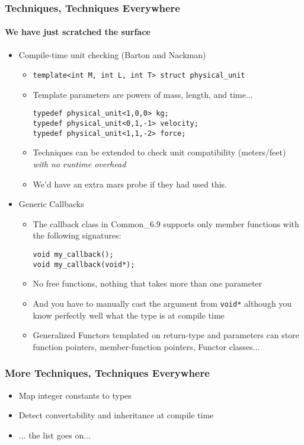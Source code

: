 
\begin{frame}[fragile,t]
\frametitle{Techniques, Techniques Everywhere}
\framesubtitle{We have just scratched the surface}
\begin{itemize}[<+->]
\item Compile-time unit checking (Barton and Nackman)
\begin{itemize}
  \item {\scriptsize \texttt{template<int M, int L, int T> struct physical\_unit}}
  \item Template parameters are powers of mass, length, and time...
{\scriptsize\begin{verbatim}
typedef physical_unit<1,0,0> kg;
typedef physical_unit<0,1,-1> velocity;
typedef physical_unit<1,1,-2> force;
\end{verbatim}
}
\item Techniques can be extended to check unit compatibility
  (meters/feet) \emph{with no runtime overhead}
\item We'd have an extra mars probe if they had used this.
\end{itemize}
\item Generic Callbacks
  \begin{itemize}
    \item The callback class in Common\_6.9 supports only member
      functions with the following signatures:
{\scriptsize\begin{verbatim}
void my_callback();
void my_callback(void*);
\end{verbatim}
}
\item No free functions, nothing that takes more than one parameter
\item And you have to manually cast the argument from \texttt{void*}
  although you know perfectly well what the type is at compile time
\item Generalized Functors templated on return-type and parameters can
  store function pointers, member-function pointers, Functor classes...
\end{itemize}
\end{itemize}
\end{frame}

\begin{frame}[fragile,t]
\frametitle{More Techniques, Techniques Everywhere}
\begin{itemize}[<+->]
\item Map integer constants to types
\item Detect convertability and inheritance at compile time
\item ... the list goes on...
\end{itemize}
\vskip 12pt
\pause
\begin{center}
\end{center}

\end{frame}
